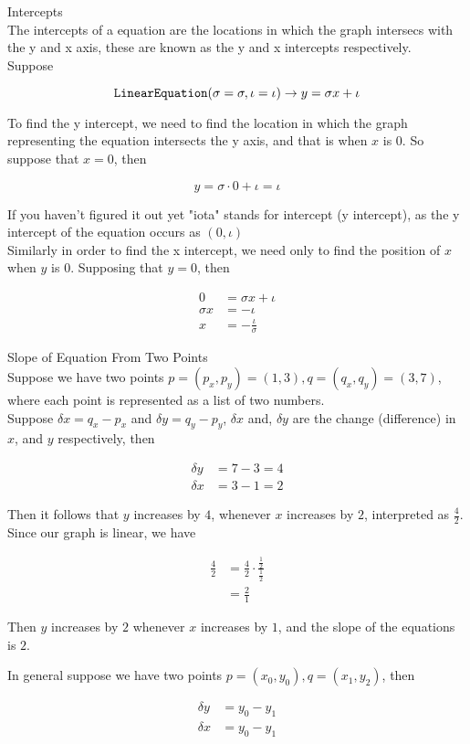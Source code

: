 \documentclass{book}
\begin{document}
  {\remark Intercepts \\
    The intercepts of a equation are the locations in which the graph intersecs with the y and x axis, these are known as the y and x intercepts respectively.\\

    Suppose

    $$\text{\texttt{LinearEquation}}(\sigma = \sigma, \iota = \iota) \to y = \sigma x + \iota$$

    To find the y intercept, we need to find the location in which the graph representing the equation intersects the y axis, and that is when $x$ is $0$. So suppose that $x = 0$, then

    $$y = \sigma \cdot 0 + \iota = \iota$$

    If you haven't figured it out yet "iota" stands for intercept (y intercept), as the y intercept of the equation occurs as $(0, \iota)$\\

    Similarly in order to find the x intercept, we need only to find the position of $x$ when $y$ is $0$. Supposing that $y = 0$, then

    \begin{align*}
      0 & = \sigma x + \iota\\
      \sigma x & = -\iota\\
      x & = -\frac{\iota}{\sigma}
    \end{align*}
  }

  {\example Slope of Equation From Two Points \\
    Suppose we have two points $p = (p_x, p_y) = (1, 3), q = (q_x, q_y) = (3, 7)$, where each point is represented as a list of two numbers.\\

    Suppose $\delta x = q_x - p_x$ and $\delta y = q_y - p_y$, $\delta x$ and, $\delta y$ are the change (difference) in $x$, and $y$ respectively, then

    \begin{align*}
      \delta y & = 7 - 3 = 4\\
      \delta x & = 3 - 1 = 2
    \end{align*}

    Then it follows that $y$ increases by $4$, whenever $x$ increases by $2$, interpreted as $\frac{4}{2}$. Since our graph is linear, we have

    \begin{align*}
      \frac{4}{2} & = \frac{4}{2} \cdot \frac{\frac{1}{2}}{\frac{1}{2}}\\
      & = \frac{2}{1}
    \end{align*}

    Then $y$ increases by $2$ whenever $x$ increases by $1$, and the slope of the equations is $2$.

    In general suppose we have two points $p = (x_0, y_0), q = (x_1, y_2)$, then

    \begin{align*}
      \delta y & = y_0 - y_1\\
      \delta x & = y_0 - y_1
    \end{align*}
  }
\end{document}
